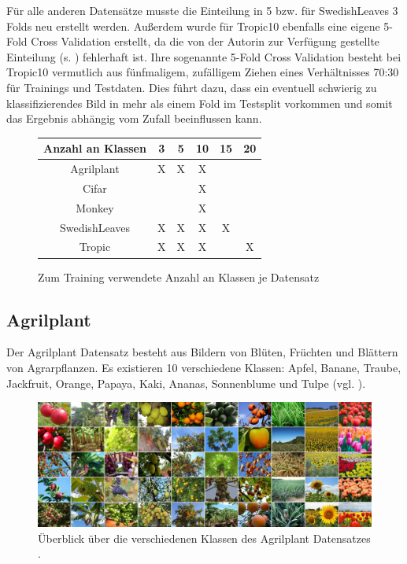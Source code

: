 Für alle anderen Datensätze musste die Einteilung in 5 bzw. für SwedishLeaves 3 Folds neu erstellt werden.
Außerdem wurde für Tropic10 ebenfalls eine eigene 5-Fold Cross Validation erstellt, da die von der Autorin zur Verfügung gestellte Einteilung (s. \cite{pawaraWebsiteDatensaetze}) fehlerhaft ist. Ihre sogenannte 5-Fold Cross Validation besteht bei Tropic10 vermutlich aus fünfmaligem, zufälligem Ziehen eines Verhältnisses 70:30 für Trainings und Testdaten. Dies führt dazu, dass ein eventuell schwierig zu klassifizierendes Bild in mehr als einem Fold im Testsplit vorkommen und somit das Ergebnis abhängig vom Zufall beeinflussen kann.

\begin{figure}[H]
\begin{tabular}{|c|c|c|c|c|c|}
\hline 
Anzahl an Klassen & 3 & 5 & 10 & 15 & 20 \\ 
\hline 
Agrilplant & X & X & X &  &  \\ 
Cifar &  &  & X &  &  \\ 
Monkey &  &  & X &  &  \\ 
SwedishLeaves & X & X & X & X &  \\ 
Tropic & X & X & X & & X \\ 
\hline 
\end{tabular} 
\caption{Zum Training verwendete Anzahl an Klassen je Datensatz}
\label{fig:DatensatzKlassen}
\end{figure}

\subsection{Agrilplant}
Der Agrilplant Datensatz \cite{pawaraWebsiteDatensaetze} besteht aus Bildern von Blüten, Früchten und Blättern von Agrarpflanzen.
Es existieren 10 verschiedene Klassen: Apfel, Banane, Traube, Jackfruit, Orange, Papaya, Kaki, Ananas, Sonnenblume und Tulpe (vgl. \cite{pawaraWebsiteDatensaetze}).
\begin{figure}[H]
\includegraphics[scale=0.2]{img/2_agrilplant-image.jpg}
\caption{Überblick über die verschiedenen Klassen des Agrilplant Datensatzes \cite{pawaraAgrilplant}.}
\label{fig:agrilplantUeberblick}
\end{figure}


